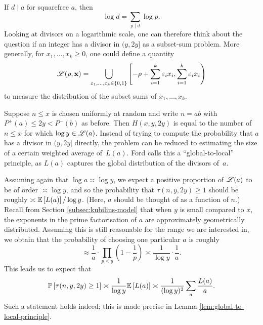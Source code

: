 \begin{remark}
    If $d \mid a$ for squarefree $a$, then
    \begin{equation*}
        \log d = \sum \limits_{p \mid d} \log p.
    \end{equation*}
    Looking at divisors on a logarithmic scale, one can therefore think about the question if an integer has a divisor in $(y, 2y]$ as a subset-sum problem.
    More generally, for $x_1, \dots, x_k \ge 0$, one could define a quantity
    \begin{equation*}
        \mathscr{L}(\rho, \mathbf{x}) = \bigcup\limits_{\varepsilon_1, \dots, \varepsilon_k \in \left\{0,1\right\}} \left[ -\rho + \sum \limits_{i = 1}^k \varepsilon_i x_i, \sum \limits_{i = 1}^k \varepsilon_i x_i \right)
    \end{equation*}
    to measure the distribution of the subset sums of $x_1, \dots, x_k$.
\end{remark}

Suppose $n \le x$ is chosen uniformly at random and write $n = ab$ with $P^+(a) \le 2y < P^-(b)$ as before.
Then $H(x, y, 2y)$ is equal to the number of $n \le x$ for which $\log y \in \mathscr{L} (a)$.
Instead of trying to compute the probability that $a$ has a divisor in $(y, 2y]$ directly, the problem can be reduced to estimating the size of a certain weighted average \mbox{of $L(a)$}.
Ford calls this a ``global-to-local'' principle, as $L(a)$ captures the global distribution of the divisors \mbox{of $a$.}

Assuming again that $\log a \asymp \log y$, we expect a positive proportion of $\mathscr{L}(a)$ to be of order $\asymp \log y$, and so the probability that $\tau(n, y, 2y) \ge 1$ should be roughly $\asymp \mathbb{E}\left[L(a)\right] / \log y$.
(Here, $a$ should be thought of as a function of $n$.)
Recall from Section \ref{subsec:kubilius-model} that when $y$ is small compared to $x$, the exponents in the prime factorisation of $a$ are approximately geometrically distributed. 
Assuming this is still reasonable for the range we are interested in, we obtain that the probability of choosing one particular $a$ is roughly
\begin{equation*}
    \approx \frac{1}{a} \cdot \prod\limits_{p \le y} \left(1 - \frac{1}{p}\right) \asymp \frac{1}{\log y} \cdot \frac{1}{a}.
\end{equation*}
This leads us to expect that
\begin{equation*}
    \mathbb{P}\left[\tau(n, y, 2y) \ge 1\right] \asymp \frac{1}{\log y} \mathbb{E}\left[L(a)\right] \asymp \frac{1}{(\log y)^2} \sum \limits_{a} \frac{L(a)}{a}.
\end{equation*}
Such a statement holds indeed; this is made precise in Lemma \ref{lem:global-to-local-principle}.

